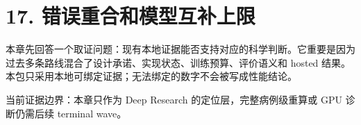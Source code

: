 \section{17. 错误重合和模型互补上限}

本章先回答一个取证问题：现有本地证据能否支持对应的科学判断。它重要是因为过去多条路线混合了设计承诺、实现状态、训练预算、评价语义和 hosted 结果。本包只采用本地可绑定证据；无法绑定的数字不会被写成性能结论。



当前证据边界：本章只作为 Deep Research 的定位层，完整病例级重算或 GPU 诊断仍需后续 terminal wave。



\clearpage